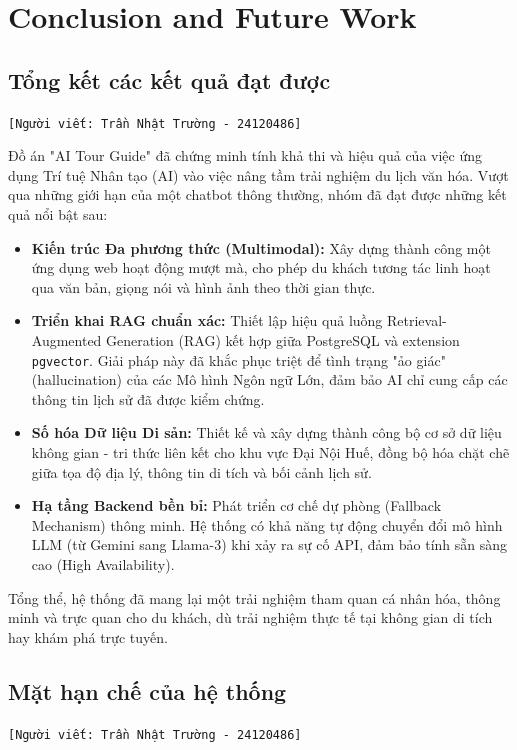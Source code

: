 \section{Conclusion and Future Work}

\subsection{Tổng kết các kết quả đạt được}
\texttt{[Người viết: Trần Nhật Trường - 24120486]}

Đồ án "AI Tour Guide" đã chứng minh tính khả thi và hiệu quả của việc ứng dụng Trí tuệ Nhân tạo (AI) vào việc nâng tầm trải nghiệm du lịch văn hóa. Vượt qua những giới hạn của một chatbot thông thường, nhóm đã đạt được những kết quả nổi bật sau:
\begin{itemize}
    \item \textbf{Kiến trúc Đa phương thức (Multimodal):} Xây dựng thành công một ứng dụng web hoạt động mượt mà, cho phép du khách tương tác linh hoạt qua văn bản, giọng nói và hình ảnh theo thời gian thực.
    \item \textbf{Triển khai RAG chuẩn xác:} Thiết lập hiệu quả luồng Retrieval-Augmented Generation (RAG) kết hợp giữa PostgreSQL và extension \texttt{pgvector}. Giải pháp này đã khắc phục triệt để tình trạng "ảo giác" (hallucination) của các Mô hình Ngôn ngữ Lớn, đảm bảo AI chỉ cung cấp các thông tin lịch sử đã được kiểm chứng.
    \item \textbf{Số hóa Dữ liệu Di sản:} Thiết kế và xây dựng thành công bộ cơ sở dữ liệu không gian - tri thức liên kết cho khu vực Đại Nội Huế, đồng bộ hóa chặt chẽ giữa tọa độ địa lý, thông tin di tích và bối cảnh lịch sử.
    \item \textbf{Hạ tầng Backend bền bỉ:} Phát triển cơ chế dự phòng (Fallback Mechanism) thông minh. Hệ thống có khả năng tự động chuyển đổi mô hình LLM (từ Gemini sang Llama-3) khi xảy ra sự cố API, đảm bảo tính sẵn sàng cao (High Availability).
\end{itemize}
Tổng thể, hệ thống đã mang lại một trải nghiệm tham quan cá nhân hóa, thông minh và trực quan cho du khách, dù trải nghiệm thực tế tại không gian di tích hay khám phá trực tuyến.

\subsection{Mặt hạn chế của hệ thống}
\texttt{[Người viết: Trần Nhật Trường - 24120486]}

